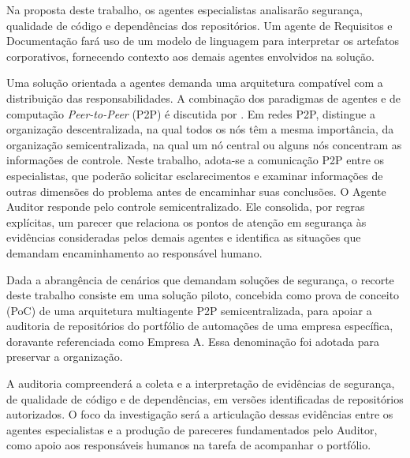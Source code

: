 Na proposta deste trabalho, os agentes especialistas analisarão segurança, qualidade de código e dependências dos repositórios. Um agente de Requisitos e Documentação fará uso de um modelo de linguagem para interpretar os artefatos corporativos, fornecendo contexto aos demais agentes envolvidos na solução.

Uma solução orientada a agentes demanda uma arquitetura compatível com a distribuição das responsabilidades. A combinação dos paradigmas de agentes e de computação \textit{Peer-to-Peer} (P2P) é discutida por . Em redes P2P,  distingue a organização descentralizada, na qual todos os nós têm a mesma importância, da organização semicentralizada, na qual um nó central ou alguns nós concentram as informações de controle. Neste trabalho, adota-se a comunicação P2P entre os especialistas, que poderão solicitar esclarecimentos e examinar informações de outras dimensões do problema antes de encaminhar suas conclusões. O Agente Auditor responde pelo controle semicentralizado. Ele consolida, por regras explícitas, um parecer que relaciona os pontos de atenção em segurança às evidências consideradas pelos demais agentes e identifica as situações que demandam encaminhamento ao responsável humano.

Dada a abrangência de cenários que demandam soluções de segurança, o recorte deste trabalho consiste em uma solução piloto, concebida como prova de conceito (PoC) de uma arquitetura multiagente P2P semicentralizada, para apoiar a auditoria de repositórios do portfólio de automações de uma empresa específica, doravante referenciada como Empresa A. Essa denominação foi adotada para preservar a organização.

A auditoria compreenderá a coleta e a interpretação de evidências de segurança, de qualidade de código e de dependências, em versões identificadas de repositórios autorizados. O foco da investigação será a articulação dessas evidências entre os agentes especialistas e a produção de pareceres fundamentados pelo Auditor, como apoio aos responsáveis humanos na tarefa de acompanhar o portfólio.


